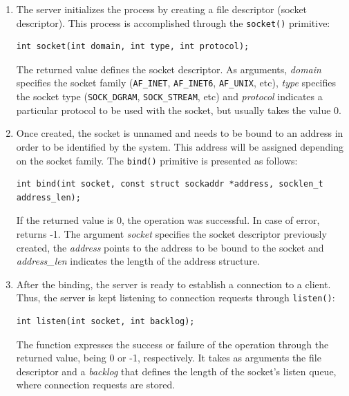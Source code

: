 \begin{enumerate}
\item The server initializes the process by creating a file descriptor (socket descriptor). This process is accomplished through the \texttt{socket()} primitive:

\begin{lstlisting}[caption=Declaration of the \texttt{socket()} function]
int socket(int domain, int type, int protocol);
\end{lstlisting}

The returned value defines the socket descriptor. As arguments, \textit{domain} specifies the socket family (\texttt{AF\_INET}, \texttt{AF\_INET6}, \texttt{AF\_UNIX}, etc), \textit{type} specifies the socket type (\texttt{SOCK\_DGRAM}, \texttt{SOCK\_STREAM}, etc) and \textit{protocol} indicates a particular protocol to be used with the socket, but usually takes the value 0.

\item Once created, the socket is unnamed and needs to be bound to an address in order to be identified by the system. This address will be assigned depending on the socket family. The \texttt{bind()} primitive is presented as follows:

\begin{lstlisting}[caption=Declaration of the \texttt{bind()} function]
int bind(int socket, const struct sockaddr *address, socklen_t address_len);
\end{lstlisting}

If the returned value is 0, the operation was successful. In case of error, returns -1. The argument \textit{socket} specifies the socket descriptor previously created, the \textit{address} points to the address to be bound to the socket and \textit{address\_len} indicates the length of the address structure.

\item After the binding, the server is ready to establish a connection to a client. Thus, the server is kept listening to connection requests through \texttt{listen()}:

\begin{lstlisting}[caption= Declaration of the \texttt{listen()} function]
int listen(int socket, int backlog);
\end{lstlisting}

The function expresses the success or failure of the operation through the returned value, being 0 or -1, respectively. It takes as arguments the file descriptor and a \textit{backlog} that defines the length of the socket's listen queue, where connection requests are stored.


\end{enumerate}
